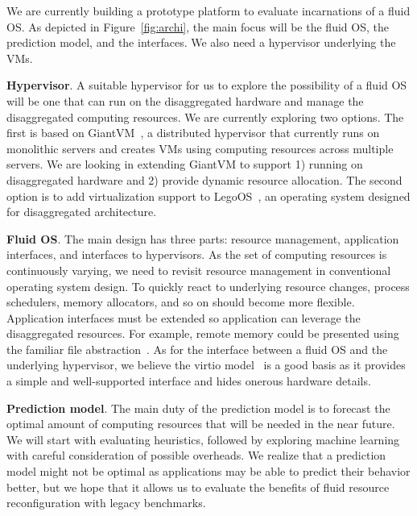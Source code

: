 We are currently building a prototype platform to evaluate incarnations
of a fluid OS. As depicted in Figure~\ref{fig:archi}, the main focus
will be the fluid OS, the prediction model, and the interfaces.
We also need a hypervisor underlying the VMs.

\noindent \textbf{Hypervisor}. A suitable hypervisor for us to
explore the possibility of a fluid OS will be one that can run on
the disaggregated hardware and manage the disaggregated computing
resources. We are currently exploring two options.  The first is
based on GiantVM~\cite{zhang2020giantvm}, a distributed hypervisor
that currently runs on monolithic servers and creates VMs using
computing resources across multiple servers.  We are looking in
extending GiantVM to support 1) running on
disaggregated hardware and 2) provide dynamic resource allocation.
The second option is to add virtualization support to
LegoOS~\cite{shan2018legoos}, an operating system designed for
disaggregated architecture.

\noindent \textbf{Fluid OS}.  The main design has three parts:
resource management, application interfaces, and interfaces to
hypervisors. As the set of computing resources is continuously
varying, we need to revisit resource management in conventional
operating system design.  To quickly react to
underlying resource changes, process schedulers, memory
allocators, and so on should become more flexible.
Application interfaces must be extended so application can
leverage the disaggregated resources.
For example, remote memory could be presented using the
familiar file abstraction~\cite{aguilera2018remote}.
As for the interface between a
fluid OS and the underlying hypervisor, we believe the
virtio model~\cite{jones2010virtio} is a good basis as it
provides a simple and well-supported interface and hides onerous
hardware details.

\noindent \textbf{Prediction model}. The main duty of the prediction
model is to forecast the optimal amount of computing resources that
will be needed in the near future.  We will start with evaluating
heuristics, followed by exploring machine learning
with careful consideration of possible overheads.
We realize that a prediction model might not be optimal
as applications may be able to predict their behavior better,
but we hope that it allows us to evaluate the benefits of fluid
resource reconfiguration with legacy benchmarks.
